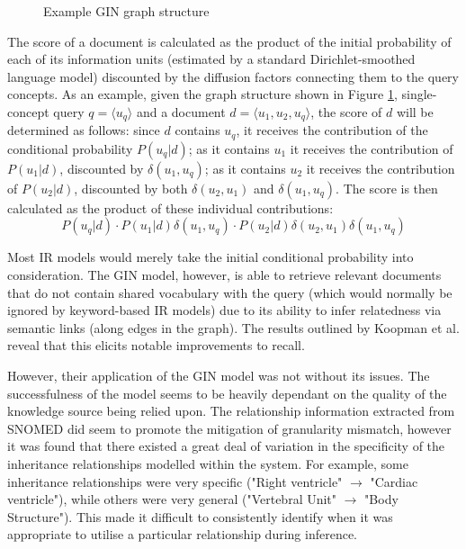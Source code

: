 \documentclass[a4paper]{report}
\begin{document}
\begin{figure}
\caption{Example GIN graph structure}
\label{gin-graph}
\begin {center}
\end{center}
\end{figure}

The score of a document is calculated as the product of the initial probability of each of its information units (estimated by a standard Dirichlet-smoothed language model) discounted by the diffusion factors connecting them to the query concepts. As an example, given the graph structure shown in Figure \ref{gin-graph}, single-concept query $q = \langle u_q \rangle$ and a document $d = \langle u_1, u_2, u_q \rangle$, the score of $d$ will be determined as follows: since $d$ contains $u_q$, it receives the contribution of the conditional probability $P(u_q|d)$; as it contains $u_1$ it receives the contribution of $P(u_1|d)$, discounted by $\delta(u_1,u_q)$; as it contains $u_2$ it receives the contribution of $P(u_2|d)$, discounted by both $\delta(u_2,u_1)$ and $\delta(u_1,u_q)$. The score is then calculated as the product of these individual contributions:
$$ P(u_q|d) \cdot P(u_1|d)\delta(u_1,u_q) \cdot P(u_2|d)\delta(u_2,u_1)\delta(u_1,u_q)$$

Most IR models would merely take the initial conditional probability into consideration. The GIN model, however, is able to retrieve relevant documents that do not contain shared vocabulary with the query (which would normally be ignored by keyword-based IR models) due to its ability to infer relatedness via semantic links (along edges in the graph). The results outlined by Koopman et al. reveal that this elicits notable improvements to recall. 

However, their application of the GIN model was not without its issues. The successfulness of the model seems to be heavily dependant on the quality of the knowledge source being relied upon. The relationship information extracted from SNOMED did seem to promote the mitigation of granularity mismatch, however it was found that there existed a great deal of variation in the specificity of the inheritance relationships modelled within the system. For example, some inheritance relationships were very specific ("Right ventricle" $\rightarrow$ "Cardiac ventricle"), while others were very general ("Vertebral Unit" $\rightarrow$ "Body Structure"). This made it difficult to consistently identify when it was appropriate to utilise a particular relationship during inference. 
\end{document}
